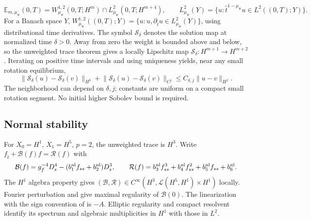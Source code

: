 \documentclass[a4paper,11pt]{article}
\numberwithin{equation}{section}
\theoremstyle{definition}
\theoremstyle{remark}
\newcommand{\norm}[1]{\lVert#1\rVert}
\newcommand{\sol}{\mathscr S}
\begin{document}
\begin{equation}\label{eq:MR-spaces}
 \mathbb E_{m,\mu_{\mathrm w}}(0,T)=W^{1,2}_{\mu_{\mathrm w}}(0,T;H^m)\cap L^2_{\mu_{\mathrm w}}(0,T;H^{m+4}),
 \qquad L^2_{\mu_{\mathrm w}}(Y)=\{u:\widehat t^{1-\mu_{\mathrm w}}u\in L^2((0,T);Y)\}.
\end{equation}
For a Banach space $Y$, $W^{1,2}_{\mu_{\mathrm w}}((0,T);Y)=\{u:u,\partial_{\widehat t}u\in L^2_{\mu_{\mathrm w}}(Y)\}$, using distributional time derivatives. The symbol $\sol_\delta$ denotes the solution map at normalized time $\delta>0$. Away from zero the weight is bounded above and below, so the unweighted trace theorem gives a locally Lipschitz map $\sol_\delta:H^{m+1}\to H^{m+2}$. Iterating on positive time intervals and using uniqueness yields, near any small rotation equilibrium,
\begin{equation}\label{eq:smoothing}
 \norm{\sol_\delta(u)-\sol_\delta(v)}_{H^3}
 +\norm{\sol_\delta(u)-\sol_\delta(v)}_{C^j}
 \le C_{\delta,j}\norm{u-v}_{H^2}.
\end{equation}
The neighborhood can depend on $\delta,j$; constants are uniform on a compact small rotation segment. No initial higher Sobolev bound is required.

\subsection{Normal stability}
For $X_0=H^1$, $X_1=H^5$, $p=2$, the unweighted trace is $H^3$. Write $f_{\widehat t}+\mathcal B(f)f=\mathcal R(f)$ with
\[
 \mathcal B(f)=g_f^{-4}D_s^4-(b_1^{\rm nl}f_{ss}+b_2^{\rm nl})D_s^3,\qquad
 \mathcal R(f)=b_3^{\rm nl}f_{ss}^3+b_4^{\rm nl}f_{ss}^2+b_5^{\rm nl}f_{ss}+b_6^{\rm nl}.
\]
The $H^1$ algebra property gives $(\mathcal B,\mathcal R)\in C^\infty(H^3,\mathcal L(H^5,H^1)\times H^1)$ locally. Fourier perturbation and \cite{deSimon} give maximal regularity of $\mathcal B(0)$. The linearization with the sign convention of \cite{PSZ} is $-A$. Elliptic regularity and compact resolvent identify its spectrum and algebraic multiplicities in $H^1$ with those in $L^2$.
\end{document}
